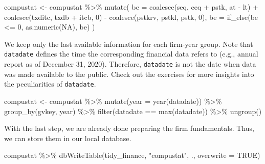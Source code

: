 \documentclass[
]{krantz}
\newenvironment{Shaded}{\begin{snugshade}}{\end{snugshade}}
\newcommand{\AttributeTok}[1]{\textcolor[rgb]{0.61,0.61,0.61}{#1}}
\newcommand{\ConstantTok}[1]{\textcolor[rgb]{0,0,0}{#1}}
\newcommand{\DecValTok}[1]{\textcolor[rgb]{0.06,0.06,0.06}{#1}}
\newcommand{\FunctionTok}[1]{\textcolor[rgb]{0,0,0}{#1}}
\newcommand{\NormalTok}[1]{#1}
\newcommand{\OtherTok}[1]{\textcolor[rgb]{0.37,0.37,0.37}{#1}}
\newcommand{\SpecialCharTok}[1]{\textcolor[rgb]{0,0,0}{#1}}
\newcommand{\StringTok}[1]{\textcolor[rgb]{0.5,0.5,0.5}{#1}}
\begin{document}
\begin{Shaded}
\begin{Highlighting}[]
\NormalTok{compustat }\OtherTok{\textless{}{-}}\NormalTok{ compustat }\SpecialCharTok{\%\textgreater{}\%}
  \FunctionTok{mutate}\NormalTok{(}
    \AttributeTok{be =} \FunctionTok{coalesce}\NormalTok{(seq, ceq }\SpecialCharTok{+}\NormalTok{ pstk, at }\SpecialCharTok{{-}}\NormalTok{ lt) }\SpecialCharTok{+}
      \FunctionTok{coalesce}\NormalTok{(txditc, txdb }\SpecialCharTok{+}\NormalTok{ itcb, }\DecValTok{0}\NormalTok{) }\SpecialCharTok{{-}}
      \FunctionTok{coalesce}\NormalTok{(pstkrv, pstkl, pstk, }\DecValTok{0}\NormalTok{),}
    \AttributeTok{be =} \FunctionTok{if\_else}\NormalTok{(be }\SpecialCharTok{\textless{}=} \DecValTok{0}\NormalTok{, }\FunctionTok{as.numeric}\NormalTok{(}\ConstantTok{NA}\NormalTok{), be)}
\NormalTok{  )}
\end{Highlighting}
\end{Shaded}

We keep only the last available information for each firm-year group. Note that \texttt{datadate} defines the time the corresponding financial data refers to (e.g., annual report as of December 31, 2020). Therefore, \texttt{datadate} is not the date when data was made available to the public. Check out the exercises for more insights into the peculiarities of \texttt{datadate}.

\begin{Shaded}
\begin{Highlighting}[]
\NormalTok{compustat }\OtherTok{\textless{}{-}}\NormalTok{ compustat }\SpecialCharTok{\%\textgreater{}\%}
  \FunctionTok{mutate}\NormalTok{(}\AttributeTok{year =} \FunctionTok{year}\NormalTok{(datadate)) }\SpecialCharTok{\%\textgreater{}\%}
  \FunctionTok{group\_by}\NormalTok{(gvkey, year) }\SpecialCharTok{\%\textgreater{}\%}
  \FunctionTok{filter}\NormalTok{(datadate }\SpecialCharTok{==} \FunctionTok{max}\NormalTok{(datadate)) }\SpecialCharTok{\%\textgreater{}\%}
  \FunctionTok{ungroup}\NormalTok{()}
\end{Highlighting}
\end{Shaded}

With the last step, we are already done preparing the firm fundamentals. Thus, we can store them in our local database.

\begin{Shaded}
\begin{Highlighting}[]
\NormalTok{compustat }\SpecialCharTok{\%\textgreater{}\%}
  \FunctionTok{dbWriteTable}\NormalTok{(tidy\_finance, }\StringTok{"compustat"}\NormalTok{, ., }\AttributeTok{overwrite =} \ConstantTok{TRUE}\NormalTok{)}
\end{Highlighting}
\end{Shaded}
\end{document}
